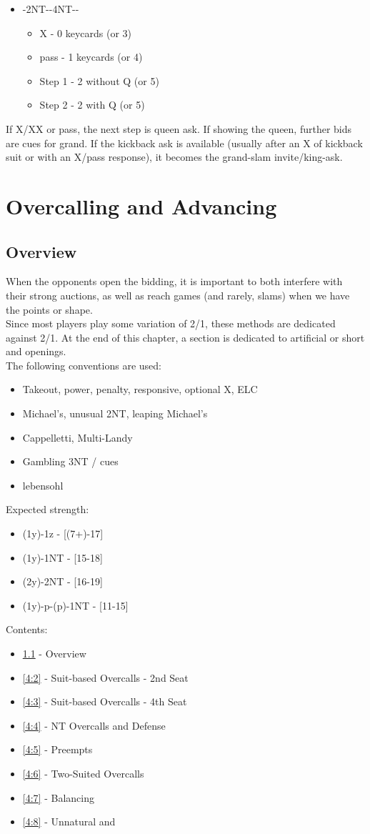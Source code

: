 \documentclass[12pt]{report}
\newcommand{\n}{\\}
\newcommand{\ul}[1]{\begin{itemize}#1\end{itemize}}
\newcommand{\li}{\item[~]}
\begin{document}
    \ul{
        \li {}-2NT--4NT--
        \ul {
            \li X - 0 keycards (or 3)
            \li pass - 1 keycards (or 4)
            \li Step 1 - 2 without Q (or 5)
            \li Step 2 - 2 with Q (or 5)
        }
    }

    If X/XX or pass, the next step is queen ask.  If showing the queen, further bids are cues for grand.  If the kickback ask is available (usually after an X of kickback suit or with an X/pass response), it becomes the grand-slam invite/king-ask.
\chapter{Overcalling and Advancing}
\section{Overview} \label{4:1}
    
    When the opponents open the bidding, it is important to both interfere with their strong auctions, as well as reach games (and rarely, slams) when we have the points or shape.\n

    Since most players play some variation of 2/1, these methods are dedicated against 2/1.  At the end of this chapter, a section is dedicated to artificial or short  and  openings. \n

    The following conventions are used:
    \begin{itemize} \itemsep0em
        \item Takeout, power, penalty, responsive, optional X, ELC
        \item Michael's, unusual 2NT, leaping Michael's
        \item Cappelletti, Multi-Landy
        \item Gambling 3NT / cues
        \item lebensohl\n
    \end{itemize}

    Expected strength:
    \begin{itemize} \itemsep0em
        \li (1y)-1z - [(7+)-17]
        \li (1y)-1NT - [15-18]
        \li (2y)-2NT - [16-19]
        \li (1y)-p-(p)-1NT - [11-15] \n
    \end{itemize}

    Contents:
    \ul {
        \li \ref{4:1} - Overview
        \li \ref{4:2} - Suit-based Overcalls - 2nd Seat
        \li \ref{4:3} - Suit-based Overcalls - 4th Seat
        \li \ref{4:4} - NT Overcalls and Defense
        \li \ref{4:5} - Preempts
        \li \ref{4:6} - Two-Suited Overcalls
        \li \ref{4:7} - Balancing
        \li \ref{4:8} - Unnatural \cl1 and \di1
    }
\end{document}
